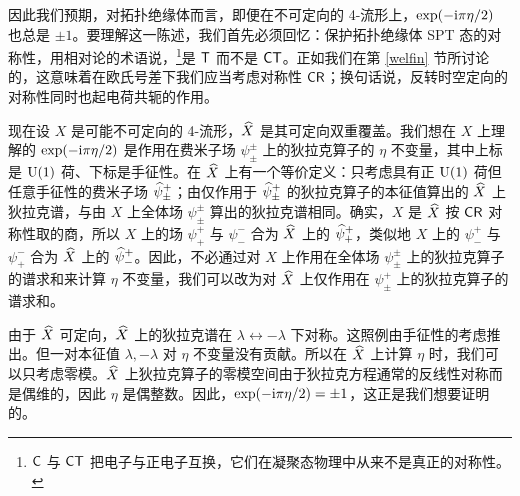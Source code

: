 因此我们预期，对拓扑绝缘体而言，即便在不可定向的 4-流形上，$\exp(-{\mathrm i}\pi \eta/2)$ 也总是 $\pm 1$。要理解这一陈述，我们首先必须回忆：保护拓扑绝缘体 SPT 态的对称性，用相对论的术语说，\footnote{${\sf{C}}$ 与 ${\sf{CT}}$ 把电子与正电子互换，它们在凝聚态物理中从来不是真正的对称性。}是 ${\sf T}$ 而不是 ${\sf{CT}}$。正如我们在第 \ref{welfin} 节所讨论的，这意味着在欧氏号差下我们应当考虑对称性 ${\sf{CR}}$；换句话说，反转时空定向的对称性同时也起电荷共轭的作用。


现在设 $X$ 是可能不可定向的 4-流形，$\widehat X$ 是其可定向双重覆盖。我们想在 $X$ 上理解的 $\exp(-{\mathrm i}\pi \eta/2)$ 是作用在费米子场 $\psi^\pm _\pm$ 上的狄拉克算子的 $\eta$ 不变量，其中上标是 ${\mathrm U}(1)$ 荷、下标是手征性。在 $\widehat X$ 上有一个等价定义：只考虑具有正 ${\mathrm U}(1)$ 荷但任意手征性的费米子场 $\widehat\psi^+_\pm$；由仅作用于 $\widehat\psi^+_\pm$ 的狄拉克算子的本征值算出的 $\widehat X$ 上狄拉克谱，与由 $X$ 上全体场 $\psi^\pm_\pm$ 算出的狄拉克谱相同。确实，$X$ 是 $\widehat X$ 按 ${\sf{CR}}$ 对称性取的商，所以 $X$ 上的场 $\psi^+_+$ 与 $\psi^-_-$ 合为 $\widehat X$ 上的 $\widehat\psi^+_+$，类似地 $X$ 上的 $\psi^+_-$ 与 $\psi^-_+$ 合为 $\widehat X$ 上的 $\widehat\psi^+_-$。因此，不必通过对 $X$ 上作用在全体场 $\psi^\pm_\pm$ 上的狄拉克算子的谱求和来计算 $\eta$ 不变量，我们可以改为对 $\widehat X$ 上仅作用在 $\psi^+_\pm$ 上的狄拉克算子的谱求和。


由于 $\widehat X$ 可定向，$\widehat X$ 上的狄拉克谱在 $\lambda\leftrightarrow -\lambda$ 下对称。这照例由手征性的考虑推出。但一对本征值 $\lambda,-\lambda$ 对 $\eta$ 不变量没有贡献。所以在 $\widehat X$ 上计算 $\eta$ 时，我们可以只考虑零模。$\widehat X$ 上狄拉克算子的零模空间由于狄拉克方程通常的反线性对称而是偶维的，因此 $\eta$ 是偶整数。因此，$\exp(-{\mathrm i}\pi \eta/2)=\pm 1$，这正是我们想要证明的。


